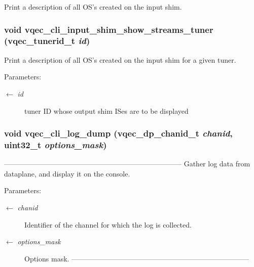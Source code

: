 Print a description of all OS's created on the input shim. 
\subsubsection{\setlength{\rightskip}{0pt plus 5cm}void vqec\_\-cli\_\-input\_\-shim\_\-show\_\-streams\_\-tuner (vqec\_\-tunerid\_\-t {\em id})}\label{vqec__cli__interface_8c_6f462431463e1152c1eb8f9e14225199}


Print a description of all OS's created on the input shim for a given tuner.

\begin{Desc}
\item[Parameters:]
\begin{description}
\item[\mbox{$\leftarrow$} {\em id}]tuner ID whose output shim ISes are to be displayed \end{description}
\end{Desc}
\subsubsection{\setlength{\rightskip}{0pt plus 5cm}void vqec\_\-cli\_\-log\_\-dump (vqec\_\-dp\_\-chanid\_\-t {\em chanid}, uint32\_\-t {\em options\_\-mask})}\label{vqec__cli__interface_8c_395e4ac2acb88e5a62e18a071ee05066}


--------------------------------------------------------------------------- Gather log data from dataplane, and display it on the console.

\begin{Desc}
\item[Parameters:]
\begin{description}
\item[\mbox{$\leftarrow$} {\em chanid}]Identifier of the channel for which the log is collected. \item[\mbox{$\leftarrow$} {\em options\_\-mask}]Options mask. --------------------------------------------------------------------------- \end{description}
\end{Desc}
